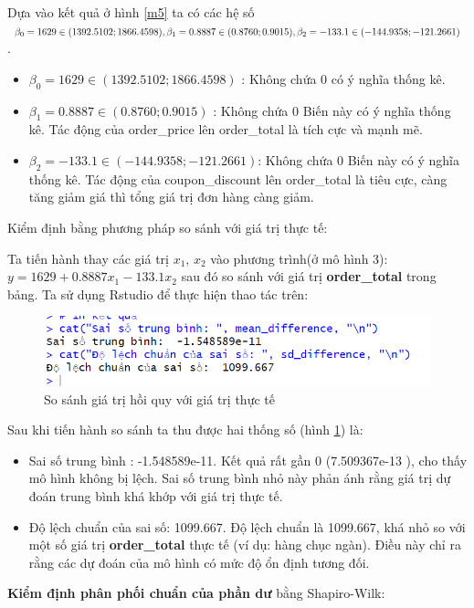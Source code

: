  Dựa vào kết quả ở hình \ref{m5} ta có các hệ số $\beta_0= 1629\in(1392.5102; 1866.4598), \beta_1= 0.8887\in(0.8760; 0.9015),\\ \beta_2= -133.1\in(-144.9358; -121.2661)$.
 \begin{itemize}
  \item $\beta_0= 1629\in(1392.5102; 1866.4598)$ : Không chứa 0 \rightarrow có ý nghĩa thống kê.
  \item $\beta_1= 0.8887\in(0.8760; 0.9015)$ : Không chứa 0 \rightarrow  Biến này có ý nghĩa thống kê. Tác động của order\_price lên order\_total là tích cực và mạnh mẽ.
  \item $\beta_2= -133.1\in(-144.9358; -121.2661)$: Không chứa 0 \rightarrow Biến này có ý nghĩa thống kê. Tác động của coupon\_discount lên order\_total là tiêu cực, càng tăng giảm giá thì tổng giá trị đơn hàng càng giảm.
 \end{itemize}
Kiểm định bằng phương pháp so sánh với giá trị thực tế:

Ta tiến hành thay các giá trị $x_1$, $x_2$ vào phương trình(ở mô hình 3): $y= 1629 + 0.8887x_1 - 133.1 x_2$ sau đó so sánh với giá trị \textbf{order\_total} trong bảng. Ta sử dụng Rstudio để thực hiện thao tác trên:

\begin{figure}[H]
  \centering
  \includegraphics[width=0.7\linewidth]{graphics/5.5.7.png}
  \caption{So sánh giá trị hồi quy với giá trị thực tế }
  \label{m7}
\end{figure}

 Sau khi tiến hành so sánh ta thu được hai thống số (hình \ref{m7}) là:
\begin{itemize}
  \item Sai số trung bình : -1.548589e-11. Kết quả rất gần 0 (7.509367e-13 ), cho thấy mô hình không bị lệch. Sai số trung bình nhỏ này phản ánh rằng giá trị dự đoán trung bình khá khớp với giá trị thực tế.
  \item Độ lệch chuẩn của sai số: 1099.667. Độ lệch chuẩn là 1099.667, khá nhỏ so với một số giá trị \textbf{order\_total} thực tế (ví dụ: hàng chục ngàn). Điều này chỉ ra rằng các dự đoán của mô hình có mức độ ổn định tương đối.
\end{itemize}

\textbf{Kiểm định phân phối chuẩn của phần dư} bằng Shapiro-Wilk:

